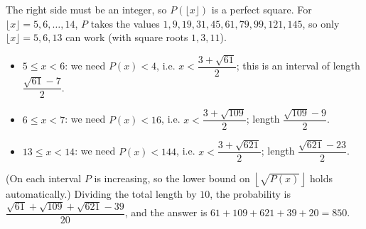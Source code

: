 The right side must be an integer, so $P(\lfloor x\rfloor)$ is a perfect square. For $\lfloor x\rfloor=5,6,\dots,14$, $P$ takes the values $1,9,19,31,45,61,79,99,121,145$, so only $\lfloor x\rfloor=5,6,13$ can work (with square roots $1,3,11$).
\begin{itemize}
\item $5\le x<6$: we need $P(x)<4$, i.e. $x<\dfrac{3+\sqrt{61}}{2}$; this is an interval of length $\dfrac{\sqrt{61}-7}{2}$.
\item $6\le x<7$: we need $P(x)<16$, i.e. $x<\dfrac{3+\sqrt{109}}{2}$; length $\dfrac{\sqrt{109}-9}{2}$.
\item $13\le x<14$: we need $P(x)<144$, i.e. $x<\dfrac{3+\sqrt{621}}{2}$; length $\dfrac{\sqrt{621}-23}{2}$.
\end{itemize}
(On each interval $P$ is increasing, so the lower bound on $\left\lfloor\sqrt{P(x)}\right\rfloor$ holds automatically.) Dividing the total length by $10$, the probability is $\dfrac{\sqrt{61}+\sqrt{109}+\sqrt{621}-39}{20}$, and the answer is $61+109+621+39+20=\boxed{850}$.
